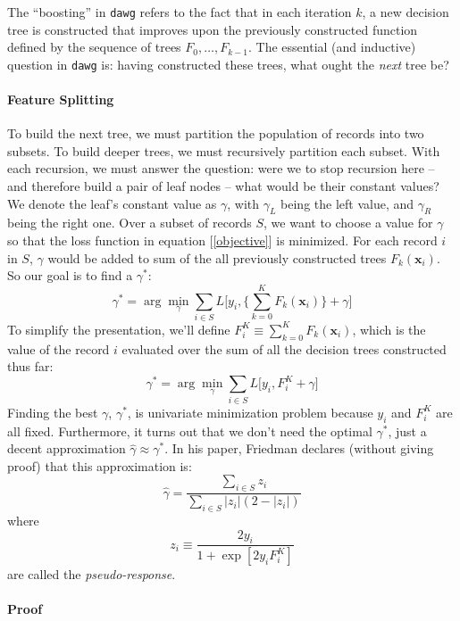 \documentclass{article}
\newcommand{\vx}[0]{\mathbf{x}}
\begin{document}
The ``boosting'' in \texttt{dawg} refers to the fact that in each iteration $k$,
a new decision tree is constructed that improves upon the previously
constructed function defined by the sequence of trees $F_0, \ldots,
F_{k-1}$.  The essential (and inductive) question in \texttt{dawg} is: having
constructed these trees, what ought the {\em next} tree be?

\paragraph{Feature Splitting}

To build the next tree, we must partition the population of records
into two subsets.  To build deeper trees, we must recursively
partition each subset.  With each recursion, we must answer the
question: were we to stop recursion here -- and therefore build a pair
of leaf nodes -- what would be their constant values?  We denote the
leaf's constant value as $\gamma$, with $\gamma_L$ being the left
value, and $\gamma_R$ being the right one.  Over a subset of records
$S$, we want to choose a value for $\gamma$ so that the loss function
in equation [\ref{objective}] is minimized.  For each record $i$ in
$S$, $\gamma$ would be added to sum of the all previously constructed
trees $F_k(\vx_i)$.  So our goal is to find a $\gamma^*$:
%
\[
\gamma^* = \arg \min_\gamma \sum_{i \in S} L
  \bigg[
    y_i, \bigg\{ \sum_{k=0}^K F_k(\vx_i) \bigg\} + \gamma
  \bigg]
\]
To simplify the presentation, we'll define $F_i^K \equiv \sum_{k=0}^K
F_k(\vx_i)$, which is the value of the record $i$ evaluated over the
sum of all the decision trees constructed thus far:
%
\[
\gamma^* = \arg \min_\gamma \sum_{i \in S} L
  \bigg[ y_i, F_i^K + \gamma \bigg]
\]
%
Finding the best $\gamma$, $\gamma^*$, is univariate minimization
problem because $y_i$ and $F_i^K$ are all fixed.  Furthermore, it
turns out that we don't need the optimal $\gamma^*$, just a decent
approximation $\hat \gamma \approx \gamma^*$.  In his paper, Friedman
declares (without giving proof) that this approximation is:
\[
\hat \gamma =
  \frac { \sum_{i \in S} z_i } { \sum_{i \in S} | z_i | ( 2 - | z_i | ) }
\]
where
\[
z_i \equiv \frac{ 2 y_i } { 1 + \exp [ 2 y_i F_i^K ] }
\]
are called the {\em pseudo-response}.

\paragraph{Proof}
\end{document}
